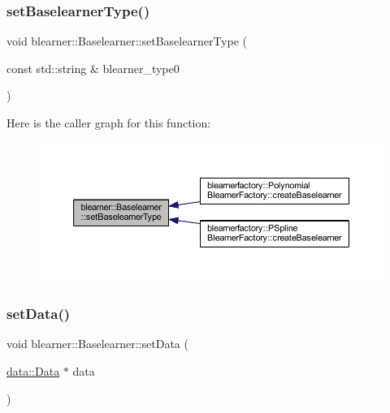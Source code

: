\mbox{\label{classblearner_1_1_baselearner_a8d78e851bae5f5b93dc46eb13d2d1ee1}} 
\subsubsection{\texorpdfstring{set\+Baselearner\+Type()}{setBaselearnerType()}}
{\footnotesize\ttfamily void blearner\+::\+Baselearner\+::set\+Baselearner\+Type (\begin{DoxyParamCaption}\item[{const std\+::string \&}]{blearner\+\_\+type0 }\end{DoxyParamCaption})}

Here is the caller graph for this function\+:\nopagebreak
\begin{figure}[H]
\begin{center}
\leavevmode
\includegraphics[width=350pt]{classblearner_1_1_baselearner_a8d78e851bae5f5b93dc46eb13d2d1ee1_icgraph}
\end{center}
\end{figure}
\mbox{\label{classblearner_1_1_baselearner_a29122c6125ef6ec03ad84602b3e2d0d4}} 
\subsubsection{\texorpdfstring{set\+Data()}{setData()}}
{\footnotesize\ttfamily void blearner\+::\+Baselearner\+::set\+Data (\begin{DoxyParamCaption}\item[{\mbox{\hyperlink{classdata_1_1_data}{data\+::\+Data}} $\ast$}]{data }\end{DoxyParamCaption})}

